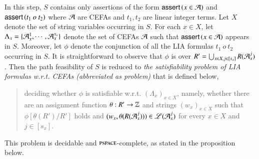In this step, $S$ %
contains only assertions of the form $\textsf{assert}\left(x \in \mathcal{A}\right)$ and  $\textsf{assert}\left(t_1\ o\ t_2\right)$  where $\mathcal{A}$ are CEFAs and $t_1, t_2$ are linear integer terms. %
%
Let $X$ denote the set of string variables occurring in $S$.
For each $x \in X$, let $\Lambda_x=\{\mathcal{A}_{x}^1, \cdots, \mathcal{A}_{x}^{s_x}\}$ denote the set of CEFAs $\mathcal{A}$ such that $\textsf{assert}\left(x \in \mathcal{A}\right)$ appears in $S$. 
Moreover, let $\phi$ denote the conjunction of all the LIA formulas $t_1\ o\ t_2$ occurring in $S$. It is straightforward to observe that $\phi$ is over %
$R'=\bigcup_{x\in X, j \in [s_x]}R(\mathcal{A}_{x}^{j})$. Then the path feasibility of $S$ is reduced to \emph{the satisfiability problem of LIA formulas w.r.t. CEFAs (abbreviated as {\lasat} problem)} that is defined below, 
\begin{quote}
deciding whether $\phi$ is satisfiable w.r.t. $(\Lambda_x)_{x \in X}$, namely,  %
%	
whether %
there are an assignment function $\theta: R' \rightarrow \mathbb{Z}$ and strings $(w_x)_{x \in X}$ such that  $\phi[\theta(R')/R']$ holds and $(w_x, \theta(R(\mathcal{A}_{x}^{j}))) \in \mathscr{L}(\mathcal{A}_{x}^{j})$ for every $x \in X$ and $j \in [s_x]$.
\end{quote}
This {\lasat} problem is decidable and $\textsc{pspace}$-complete, as stated in the proposition below.

%	
% 

